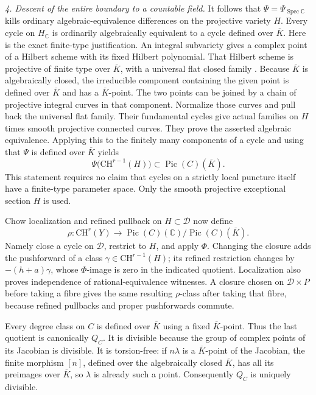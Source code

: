 \emph{4. Descent of the entire boundary to a countable field.}
It follows that $\Psi=\Psi_{\operatorname{Spec}\mathbb C}$
kills ordinary algebraic-equivalence differences on the
projective variety $H$. Every cycle on $H_{\mathbb C}$ is
ordinarily algebraically equivalent to a cycle defined over
$\overline K$. Here is the exact finite-type justification.
An integral subvariety gives a complex point of a Hilbert
scheme with its fixed Hilbert polynomial. That Hilbert
scheme is projective of finite type over $\overline K$,
with a universal flat closed family
\citep[Theorems 3.1--3.2 and the Hilbert specialization,
pp.~259--260, 265--266]{D_GrothendieckHilbert1961}.
Because $\overline K$ is algebraically closed, the irreducible
component containing the given point is defined over
$\overline K$ and has a $\overline K$-point. The two points
can be joined by a chain of projective integral curves
in that component. Normalize those curves and pull back
the universal flat family. Their fundamental cycles give
actual families on $H$ times smooth projective connected
curves. They prove the asserted algebraic equivalence.
Applying this to the finitely many components of a cycle
and using that $\Psi$ is defined over $\overline K$ yields
\[
 \Psi\bigl(\mathrm{CH}^{r-1}(H)\bigr)
                  \subset\operatorname{Pic}(C)(\overline K).
\]
This statement requires no claim that cycles on a strictly
local puncture itself have a finite-type parameter space.
Only the smooth projective exceptional section $H$ is used.

Chow localization and refined pullback on
$H\subset\mathcal D$ now define
\[
 \rho:\mathrm{CH}^r(Y)\longrightarrow
                  \operatorname{Pic}(C)(\mathbb C)/
                  \operatorname{Pic}(C)(\overline K).
\]
Namely close a cycle on $\mathcal D$, restrict to $H$, and
apply $\Phi$. Changing the closure adds the pushforward of
a class $\gamma\in\mathrm{CH}^{r-1}(H)$; its refined
restriction changes by $-(h+a)\gamma$, whose $\Phi$-image
is zero in the indicated quotient. Localization also proves
independence of rational-equivalence witnesses. A closure
chosen on $\mathcal D\times P$ before taking a fibre gives
the same resulting $\rho$-class after taking that fibre,
because refined pullbacks and proper pushforwards commute.

Every degree class on $C$ is defined over $\overline K$
using a fixed $\overline K$-point. Thus the last quotient is
canonically $Q_C$. It is divisible because the group of
complex points of its Jacobian is divisible. It is
torsion-free: if $n\lambda$ is a $\overline K$-point of the
Jacobian, the finite morphism $[n]$, defined over the
algebraically closed $\overline K$, has all its preimages
over $\overline K$, so $\lambda$ is already such a point.
Consequently $Q_C$ is uniquely divisible.

